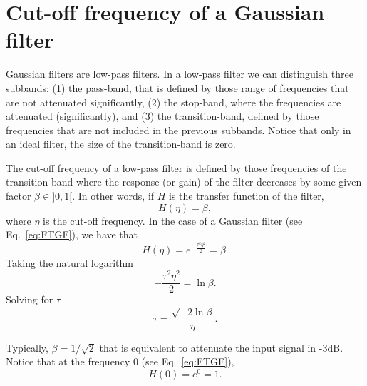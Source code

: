 \documentclass{article}
\begin{document}

\section{Cut-off frequency of a Gaussian filter}
\label{sec:tau_VS_eta}

Gaussian filters are low-pass filters. In a low-pass filter we can
distinguish three subbands: (1) the pass-band, that is defined by
those range of frequencies that are not attenuated significantly, (2)
the stop-band, where the frequencies are attenuated (significantly),
and (3) the transition-band, defined by those frequencies that are not
included in the previous subbands. Notice that only in an ideal
filter, the size of the transition-band is zero.

The cut-off frequency of a low-pass filter is defined by those
frequencies of the transition-band where the response (or gain) of the
filter decreases by some given factor $\beta\in]0,1[$. In other words,
if $H$ is the transfer function of the filter,
\begin{equation}
  H(\eta) = \beta,
\end{equation}
where $\eta$ is the cut-off frequency. In the case of a Gaussian
filter (see Eq.~\ref{eq:FTGF}), we have that
\begin{equation*}
  H(\eta) = e^{-\frac{\tau^2\eta^2}{2}} = \beta.
\end{equation*}
Taking the natural logarithm
\begin{equation*}
  -\frac{\tau^2\eta^2}{2} = \ln\beta.
\end{equation*}
Solving for $\tau$
\begin{equation}
  \tau = \frac{\sqrt{-2\ln\beta}}{\eta}.
  \label{eq:tau_VS_eta}
\end{equation}

Typically, $\beta=1/\sqrt{2}$ that is equivalent to attenuate the
input signal in -3dB. Notice that at the frequency 0 (see
Eq.~\ref{eq:FTGF}),
\begin{equation*}
  H(0) = e^0=1.
\end{equation*}
\end{document}
